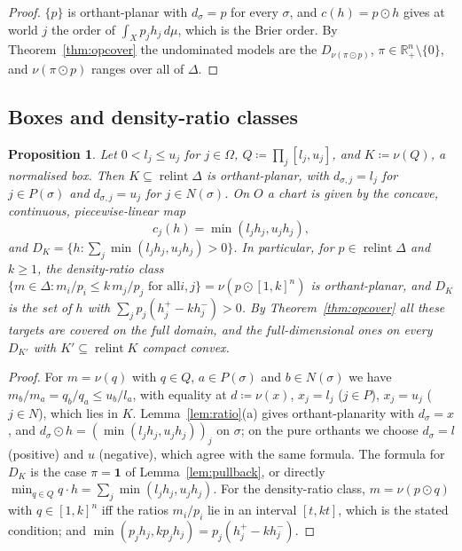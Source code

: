 \documentclass[11pt]{article}
\newcommand{\R}{\mathbb{R}}
\newcommand{\one}{\mathbf{1}}
\DeclareMathOperator{\relint}{relint}
\theoremstyle{plain}
\newtheorem{proposition}[theorem]{Proposition}
\theoremstyle{definition}
\theoremstyle{remark}
\begin{document}
\begin{proof}
$\{p\}$ is orthant-planar with $d_\sigma=p$ for every $\sigma$, and $c(h)=p\odot h$ gives at
world $j$ the order of $\int_Xp_jh_j\,d\mu$, which is the Brier order. By
Theorem~\ref{thm:opcover} the undominated models are the $D_{\nu(\pi\odot p)}$, $\pi\in
\R^n_+\setminus\{0\}$, and $\nu(\pi\odot p)$ ranges over all of $\Delta$.
\end{proof}

\subsection{Boxes and density-ratio classes}

\begin{proposition}\label{prop:box}
Let $0<l_j\le u_j$ for $j\in\Omega$, $Q\coloneqq\prod_j[l_j,u_j]$, and $K\coloneqq\nu(Q)$, a
\emph{normalised box}. Then $K\subseteq\relint\Delta$ is orthant-planar, with
$d_{\sigma,j}=l_j$ for $j\in P(\sigma)$ and $d_{\sigma,j}=u_j$ for $j\in N(\sigma)$. On $O$ a
chart is given by the concave, continuous, piecewise-linear map
\[
  c_j(h)=\min(l_jh_j,u_jh_j),
\]
and $D_K=\{h:\sum_j\min(l_jh_j,u_jh_j)>0\}$. In particular, for $p\in\relint\Delta$ and
$k\ge1$, the density-ratio class $\{m\in\Delta:m_i/p_i\le k\,m_j/p_j\text{ for all
}i,j\}=\nu(p\odot[1,k]^n)$ is orthant-planar, and $D_K$ is the set of $h$ with
$\sum_jp_j(h_j^+-kh_j^-)>0$. By Theorem~\ref{thm:opcover} all these targets are covered on
the full domain, and the full-dimensional ones on every $D_{K'}$ with $K'\subseteq\relint
K$ compact convex.
\end{proposition}

\begin{proof}
For $m=\nu(q)$ with $q\in Q$, $a\in P(\sigma)$ and $b\in N(\sigma)$ we have $m_b/m_a=q_b/q_a
\le u_b/l_a$, with equality at $d\coloneqq\nu(x)$, $x_j=l_j$ ($j\in P$), $x_j=u_j$ ($j\in
N$), which lies in $K$. Lemma~\ref{lem:ratio}(a) gives orthant-planarity with
$d_\sigma=x$, and $d_{\sigma}\odot h=(\min(l_jh_j,u_jh_j))_j$ on $\sigma$; on the pure
orthants we choose $d_\sigma=l$ (positive) and $u$ (negative), which agree with the same
formula. The formula for $D_K$ is the case $\pi=\one$ of Lemma~\ref{lem:pullback}, or
directly $\min_{q\in Q}q\cdot h=\sum_j\min(l_jh_j,u_jh_j)$. For the density-ratio class,
$m=\nu(p\odot q)$ with $q\in[1,k]^n$ iff the ratios $m_i/p_i$ lie in an interval
$[t,kt]$, which is the stated condition; and $\min(p_jh_j,kp_jh_j)=p_j(h_j^+-kh_j^-)$.
\end{proof}
\end{document}
